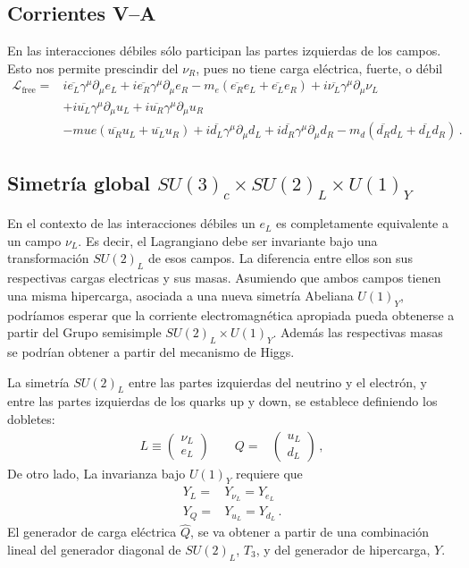 \begin{frame}
\subsection*{Corrientes V--A}
\label{sec:corrientes-v}
En las interacciones débiles sólo participan las partes izquierdas de los campos. Esto nos permite prescindir del $\nu_R$, pues no tiene carga eléctrica, fuerte, o débil
\begin{align}
  \mathcal{L}_{\text{free}}
=&i\overline{e_L}\gamma^\mu\partial_\mu e_L+i\overline{e_R}\gamma^\mu\partial_\mu e_R-m_e(\overline{e_R}e_L+\overline{e_L}e_R)+
i\overline{\nu_L}\gamma^\mu\partial_\mu\nu_L\nonumber\\
&+i\overline{u_L}\gamma^\mu\partial_\mu u_L+i\overline{u_R}\gamma^\mu\partial_\mu u_R\nonumber\\
&-mue(\overline{u_R}u_L+\overline{u_L}u_R)+
i\overline{d_L}\gamma^\mu\partial_\mu d_L+i\overline{d_R}\gamma^\mu\partial_\mu d_R-m_d(\overline{d_R}d_L+\overline{d_L}d_R)\,.
\end{align}


\subsection*{Simetría global $SU(3)_c\times  SU(2)_L\times  U(1)_Y$}
\label{sec:simetr-glob-su2_l}

En el contexto de las interacciones débiles un $e_L$ es completamente equivalente a un campo $\nu_L$. Es decir, el Lagrangiano debe ser invariante bajo una transformación $SU(2)_L$ de esos campos. La diferencia entre ellos son sus respectivas cargas electricas y sus masas. Asumiendo que ambos campos tienen una misma hipercarga, asociada a una nueva simetría Abeliana $U(1)_Y$, podríamos esperar que la corriente electromagnética apropiada pueda obtenerse a partir del Grupo semisimple $SU(2)_L\times  U(1)_Y$. Además las respectivas masas se podrían obtener a partir del mecanismo de Higgs. 

La simetría $SU(2)_L$ entre las partes izquierdas del neutrino y el electrón, y entre las partes izquierdas de los quarks up y down, se establece  definiendo los dobletes:
  \begin{align}
    L\equiv\begin{pmatrix}
      \nu_L\\
      e_L      
    \end{pmatrix}\qquad   Q=&\begin{pmatrix}
    u_L\\
    d_L
  \end{pmatrix}\,,
  \end{align}
De otro lado, La invarianza bajo $U(1)_Y$ requiere que
\begin{align}
  Y_L=&Y_{\nu_L}=Y_{e_L}\nonumber\\
  Y_Q=&Y_{u_L}=Y_{d_L}\,.
\end{align}
El generador de carga eléctrica $\widehat{Q}$, se va obtener a partir de una combinación lineal del generador diagonal de $SU(2)_L$, $T_3$, y del generador de hipercarga, $Y$.


\end{frame}
